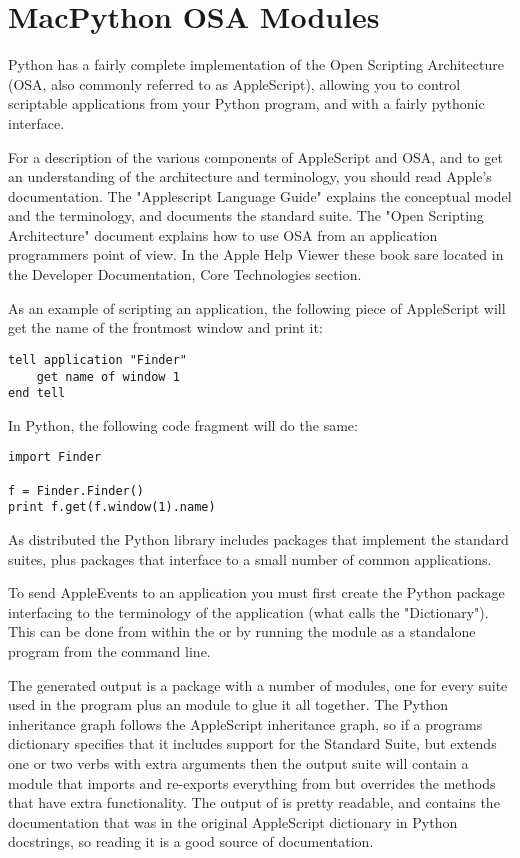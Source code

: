 \chapter{MacPython OSA Modules \label{scripting}}

Python has a fairly complete implementation of the Open Scripting
Architecture (OSA, also commonly referred to as AppleScript), allowing
you to control scriptable applications from your Python program,
and with a fairly pythonic interface. 

For a description of the various components of AppleScript and OSA, and
to get an understanding of the architecture and terminology, you should
read Apple's documentation. The "Applescript Language Guide" explains
the conceptual model and the terminology, and documents the standard
suite. The "Open Scripting Architecture" document explains how to use
OSA from an application programmers point of view. In the Apple Help
Viewer these book sare located in the Developer Documentation, Core
Technologies section.


As an example of scripting an application, the following piece of
AppleScript will get the name of the frontmost  window
and print it:
	
\begin{verbatim}
tell application "Finder"
    get name of window 1
end tell
\end{verbatim}

In Python, the following code fragment will do the same:

\begin{verbatim}
import Finder

f = Finder.Finder()
print f.get(f.window(1).name)
\end{verbatim}

As distributed the Python library includes packages that implement the
standard suites, plus packages that interface to a small number of
common applications.

To send AppleEvents to an application you must first create the Python
package interfacing to the terminology of the application (what
 calls the "Dictionary"). This can be done from
within the  or by running the
 module as a standalone program from the command
line.

The generated output is a package with a number of modules, one for
every suite used in the program plus an  module to glue
it all together. The Python inheritance graph follows the AppleScript
inheritance graph, so if a programs dictionary specifies that it
includes support for the Standard Suite, but extends one or two verbs
with extra arguments then the output suite will contain a module
 that imports and re-exports everything from
 but overrides the methods that have
extra functionality. The output of  is pretty
readable, and contains the documentation that was in the original
AppleScript dictionary in Python docstrings, so reading it is a good
source of documentation.

